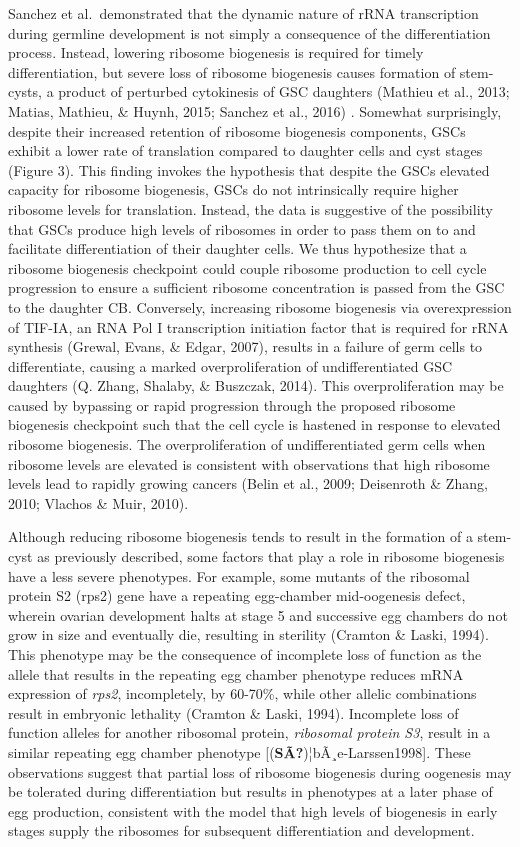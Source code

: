 \documentclass[12pt,oneside]{reedthesis}
\begin{document}
Sanchez et al.~demonstrated that the dynamic nature of rRNA
transcription during germline development is not simply a consequence of
the differentiation process. Instead, lowering ribosome biogenesis is
required for timely differentiation, but severe loss of ribosome
biogenesis causes formation of stem-cysts, a product of perturbed
cytokinesis of GSC daughters (Mathieu et al., 2013; Matias, Mathieu, \& Huynh, 2015; Sanchez et al., 2016) . Somewhat surprisingly, despite their increased
retention of ribosome biogenesis components, GSCs exhibit a lower rate
of translation compared to daughter cells and cyst stages (Figure 3).
This finding invokes the hypothesis that despite the GSCs elevated
capacity for ribosome biogenesis, GSCs do not intrinsically require
higher ribosome levels for translation. Instead, the data is suggestive
of the possibility that GSCs produce high levels of ribosomes in order
to pass them on to and facilitate differentiation of their daughter
cells. We thus hypothesize that a ribosome biogenesis checkpoint could
couple ribosome production to cell cycle progression to ensure a
sufficient ribosome concentration is passed from the GSC to the daughter
CB. Conversely, increasing ribosome biogenesis via overexpression of
TIF-IA, an RNA Pol I transcription initiation factor that is required
for rRNA synthesis (Grewal, Evans, \& Edgar, 2007), results in a failure of germ cells
to differentiate, causing a marked overproliferation of undifferentiated
GSC daughters (Q. Zhang, Shalaby, \& Buszczak, 2014). This overproliferation may be caused by
bypassing or rapid progression through the proposed ribosome biogenesis
checkpoint such that the cell cycle is hastened in response to elevated
ribosome biogenesis. The overproliferation of undifferentiated germ
cells when ribosome levels are elevated is consistent with observations
that high ribosome levels lead to rapidly growing cancers
(Belin et al., 2009; Deisenroth \& Zhang, 2010; Vlachos \& Muir, 2010).

Although reducing ribosome biogenesis tends to result in the formation
of a stem-cyst as previously described, some factors that play a role in
ribosome biogenesis have a less severe phenotypes. For example, some
mutants of the ribosomal protein S2 (rps2) gene have a repeating
egg-chamber mid-oogenesis defect, wherein ovarian development halts at
stage 5 and successive egg chambers do not grow in size and eventually
die, resulting in sterility (Cramton \& Laski, 1994). This phenotype may be
the consequence of incomplete loss of function as the allele that
results in the repeating egg chamber phenotype reduces mRNA expression
of \emph{rps2}, incompletely, by 60-70\%, while other allelic combinations
result in embryonic lethality (Cramton \& Laski, 1994). Incomplete loss of
function alleles for another ribosomal protein, \emph{ribosomal protein S3},
result in a similar repeating egg chamber phenotype
{[}(\textbf{SÃ?})¦bÃ¸e-Larssen1998{]}. These observations suggest that partial loss of
ribosome biogenesis during oogenesis may be tolerated during
differentiation but results in phenotypes at a later phase of egg
production, consistent with the model that high levels of biogenesis in
early stages supply the ribosomes for subsequent differentiation and
development.
\end{document}
